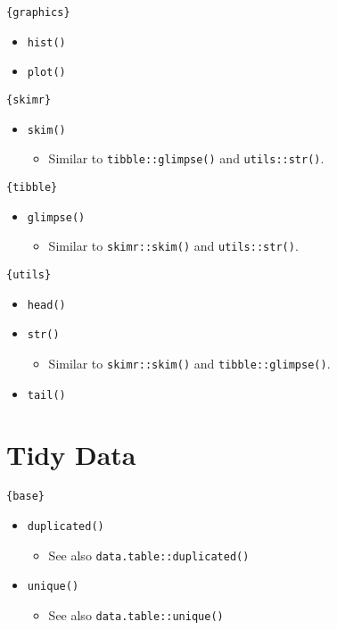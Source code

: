 \documentclass[
]{book}
\providecommand{\tightlist}{%
  \setlength{\itemsep}{0pt}\setlength{\parskip}{0pt}}
\begin{document}
\texttt{\{graphics\}}

\begin{itemize}
\tightlist
\item
  \texttt{hist()}
\item
  \texttt{plot()}
\end{itemize}

\texttt{\{skimr\}}

\begin{itemize}
\tightlist
\item
  \texttt{skim()}

  \begin{itemize}
  \tightlist
  \item
    Similar to \texttt{tibble::glimpse()} and \texttt{utils::str()}.
  \end{itemize}
\end{itemize}

\texttt{\{tibble\}}

\begin{itemize}
\tightlist
\item
  \texttt{glimpse()}

  \begin{itemize}
  \tightlist
  \item
    Similar to \texttt{skimr::skim()} and \texttt{utils::str()}.
  \end{itemize}
\end{itemize}

\texttt{\{utils\}}

\begin{itemize}
\tightlist
\item
  \texttt{head()}
\item
  \texttt{str()}

  \begin{itemize}
  \tightlist
  \item
    Similar to \texttt{skimr::skim()} and \texttt{tibble::glimpse()}.
  \end{itemize}
\item
  \texttt{tail()}
\end{itemize}

\hypertarget{tidy-data}{%
\section{Tidy Data}\label{tidy-data}}

\texttt{\{base\}}

\begin{itemize}
\tightlist
\item
  \texttt{duplicated()}

  \begin{itemize}
  \tightlist
  \item
    See also \texttt{data.table::duplicated()}
  \end{itemize}
\item
  \texttt{unique()}

  \begin{itemize}
  \tightlist
  \item
    See also \texttt{data.table::unique()}
  \end{itemize}
\end{itemize}
\end{document}
